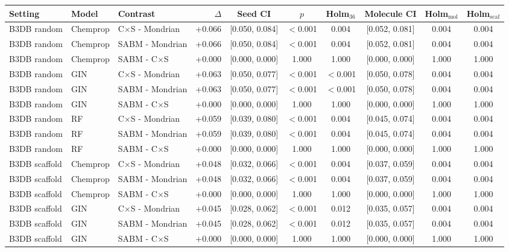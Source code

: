 \begin{tabular}{lllrcccccc}
\toprule
Setting & Model & Contrast & $\Delta$ & Seed CI & $p$ & Holm$_{36}$ & Molecule CI & Holm$_{\mathrm{mol}}$ & Holm$_{\mathrm{scaf}}$\\
\midrule
B3DB random & Chemprop & C$\times$S - Mondrian & +0.066 & [0.050, 0.084] & $<$0.001 & 0.004 & [0.052, 0.081] & 0.004 & 0.004\\
B3DB random & Chemprop & SABM - Mondrian & +0.066 & [0.050, 0.084] & $<$0.001 & 0.004 & [0.052, 0.081] & 0.004 & 0.004\\
B3DB random & Chemprop & SABM - C$\times$S & +0.000 & [0.000, 0.000] & 1.000 & 1.000 & [0.000, 0.000] & 1.000 & 1.000\\
B3DB random & GIN & C$\times$S - Mondrian & +0.063 & [0.050, 0.077] & $<$0.001 & $<$0.001 & [0.050, 0.078] & 0.004 & 0.004\\
B3DB random & GIN & SABM - Mondrian & +0.063 & [0.050, 0.077] & $<$0.001 & $<$0.001 & [0.050, 0.078] & 0.004 & 0.004\\
B3DB random & GIN & SABM - C$\times$S & +0.000 & [0.000, 0.000] & 1.000 & 1.000 & [0.000, 0.000] & 1.000 & 1.000\\
B3DB random & RF & C$\times$S - Mondrian & +0.059 & [0.039, 0.080] & $<$0.001 & 0.004 & [0.045, 0.074] & 0.004 & 0.004\\
B3DB random & RF & SABM - Mondrian & +0.059 & [0.039, 0.080] & $<$0.001 & 0.004 & [0.045, 0.074] & 0.004 & 0.004\\
B3DB random & RF & SABM - C$\times$S & +0.000 & [0.000, 0.000] & 1.000 & 1.000 & [0.000, 0.000] & 1.000 & 1.000\\
B3DB scaffold & Chemprop & C$\times$S - Mondrian & +0.048 & [0.032, 0.066] & $<$0.001 & 0.004 & [0.037, 0.059] & 0.004 & 0.004\\
B3DB scaffold & Chemprop & SABM - Mondrian & +0.048 & [0.032, 0.066] & $<$0.001 & 0.004 & [0.037, 0.059] & 0.004 & 0.004\\
B3DB scaffold & Chemprop & SABM - C$\times$S & +0.000 & [0.000, 0.000] & 1.000 & 1.000 & [0.000, 0.000] & 1.000 & 1.000\\
B3DB scaffold & GIN & C$\times$S - Mondrian & +0.045 & [0.028, 0.062] & $<$0.001 & 0.012 & [0.035, 0.057] & 0.004 & 0.004\\
B3DB scaffold & GIN & SABM - Mondrian & +0.045 & [0.028, 0.062] & $<$0.001 & 0.012 & [0.035, 0.057] & 0.004 & 0.004\\
B3DB scaffold & GIN & SABM - C$\times$S & +0.000 & [0.000, 0.000] & 1.000 & 1.000 & [0.000, 0.000] & 1.000 & 1.000\\

\end{tabular}
